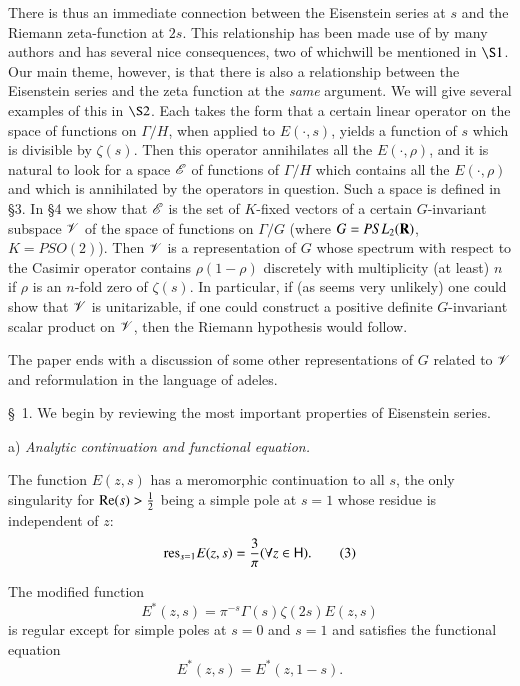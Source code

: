 There is thus an immediate connection between the Eisenstein series at $s$ and the Riemann zeta-function at $2s$. This relationship has been made use of by many authors and has several nice consequences, two of which\pageoriginale will be mentioned in $\S 1$. Our main theme, however, is that there is also a relationship between the Eisenstein series and the zeta function at the \textit{same} argument. We will give several examples of this in $\S 2$. Each takes the form that a certain linear operator on the space of functions on $\Gamma/H$, when applied to $E(\cdot, s)$, yields a function of $s$ which is divisible by $\zeta(s)$. Then this operator annihilates all the $E (\cdot, \rho)$, and it is natural to look for a space $\mathscr{E}$ of functions of $\Gamma / H$ which contains all the $E(\cdot, \rho)$ and which is annihilated by the operators in question. Such a space is defined in \S 3. In \S 4 we show that $\mathscr{E}$ is the set of $K$-fixed vectors of a certain $G$-invariant subspace $\mathscr{V}$ of the space of functions on $\Gamma / G$ (where $G = PSL_2 (\mathbf{R})$, $K = PSO(2)$). Then $\mathscr{V}$ is a representation of $G$ whose spectrum with respect to the Casimir operator contains $\rho (1-\rho)$  discretely with multiplicity (at least) $n$ if $\rho$ is an $n$-fold zero of $\zeta(s)$. In particular, if (as seems very unlikely) one could show that $\mathscr{V}$ is unitarizable, \ie if one could construct a positive definite $G$-invariant scalar product on $\mathscr{V}$, then the Riemann hypothesis would follow.

The paper ends with a discussion of some other representations of $G$ related to $\mathscr{V}$ and reformulation in the language of adeles. 

\smallskip
\S~1. We begin by reviewing the most important properties of Eisenstein series. 

a) \textit{Analytic continuation and functional equation.}

\eject

The function $E(z,s)$ has a meromorphic continuation to all $s$, the only singularity for $\operatorname{Re} (s) > \frac{1}{2}$ being a simple pole at $s =1$ whose residue is independent of $z$:
\begin{equation*}
\mathrm{res}_{s=1} E(z,s) = \frac{3}{\pi} (\forall z \in \mathsf{H}). \tag{3}\label{art10-eq3}
\end{equation*}

The modified function
\begin{equation*}
E^\ast (z,s) = \pi^{-s} \Gamma (s) \zeta(2s) E (z,s) \tag{4}\label{art10-eq4} 
\end{equation*}
is regular except for simple poles at $s =0$ and $s =1$ and satisfies the functional equation 
\begin{equation*}
E^{\ast} (z,s) = E^\ast (z, 1 - s). \tag{5}\label{art10-eq5}
\end{equation*}

